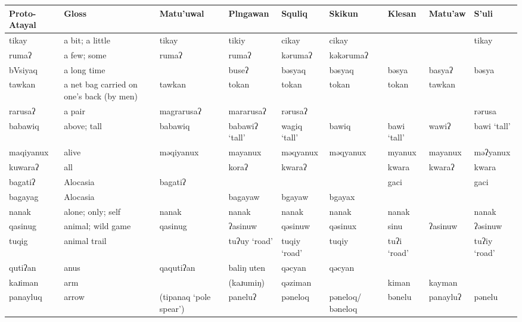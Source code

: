 
\begin{landscape}

\begin{longtable}{*{9}{>{\raggedright\arraybackslash}p{}}}
Proto-Atayal & Gloss & Matu'uwal & Plngawan & Squliq & Skikun & Klesan & Matu'aw & S'uli\\\toprule\endhead
\text{*}tikay        & a bit; a little & tikay & tikiy & cikay & cikay &  &  & tikay\\
\text{*}rumaʔ        & a few; some & rumaʔ & rumaʔ & kərumaʔ & kəkərumaʔ &  &  & \\
\text{*}bVsiyaq      & a long time &  & buseʔ & bəsyaq & bəsyaq & bəsya & basyaʔ & bəsya\\
\text{*}tawkan       & a net bag carried on one's back (by men) & tawkan & tokan & tokan & tokan & tokan & tawkan & \\
\text{*}rarusaʔ     & a pair & magrarusaʔ & mararusaʔ & rərusaʔ &  &  &  & rərusa\\
\text{*}babawiq      & above; tall & babawiq & babawiʔ `tall' & wagiq `tall' & bawiq & bawi `tall' & wawiʔ & bawi `tall'\\
\text{*}maqiyanux    & alive & məqiyanux & mayanux & məqyanux & məqyanux & myanux & mayanux & məʔyanux\\
\text{*}kuwaraʔ      & all &  & koraʔ & kwaraʔ &  & kwara & kwaraʔ & kwara\\
\text{*}bagatiʔ      & Alocasia & bagatiʔ &  &  &  & gaci &  & gaci\\
\text{*}bagayag      & Alocasia &  & bagayaw & bgayaw & bgayax &  &  & \\
\text{*}nanak        & alone; only; self & nanak & nanak & nanak & nanak & nanak &  & nanak\\
\text{*}qasinug      & animal; wild game & qasinug & ʔasinuw & qəsinuw & qəsinux & sinu & ʔasinuw & ʔəsinuw\\
\text{*}tuqig        & animal trail &  & tuʔuy `road' & tuqiy `road' & tuqiy & tuʔi `road' &  & tuʔiy `road'\\
\text{*}qutiʔan      & anus & qaqutiʔan & baliŋ uten & qəcyan & qəcyan &  &  & \\
\text{*}kaɹiman      & arm &  & (kaɹumiŋ) & qəziman &  & kiman & kayman & \\
\text{*}panayluq     & arrow & (tipanaq \newline `pole spear') & paneluʔ & pəneloq & pəneloq/ \newline bəneloq & bənelu & panayluʔ & pənelu\\

\end{longtable}
\end{landscape}
